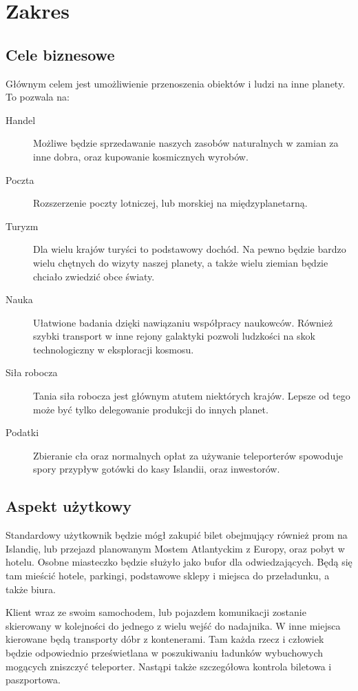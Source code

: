 \section{Zakres} 
\subsection{Cele biznesowe}
Głównym celem jest umożliwienie przenoszenia obiektów i ludzi na inne planety.
To pozwala na:
\begin{description}
\item[Handel] Możliwe będzie sprzedawanie naszych zasobów naturalnych w zamian za inne dobra, oraz kupowanie kosmicznych wyrobów.
\item[Poczta] Rozszerzenie poczty lotniczej, lub morskiej na międzyplanetarną.
\item[Turyzm] Dla wielu krajów turyści to podstawowy dochód. Na pewno będzie bardzo wielu chętnych do wizyty naszej planety, a także wielu ziemian będzie chciało zwiedzić obce światy.
\item[Nauka] Ułatwione badania dzięki nawiązaniu współpracy naukowców. Również szybki transport w inne rejony galaktyki pozwoli ludzkości na skok technologiczny w eksploracji kosmosu.
\item[Siła robocza] Tania siła robocza jest głównym atutem niektórych krajów. Lepsze od tego może być tylko delegowanie produkcji do innych planet.
\item[Podatki] Zbieranie cła oraz normalnych opłat za używanie teleporterów spowoduje spory przypływ gotówki do kasy Islandii, oraz inwestorów.
\end{description}

\subsection{Aspekt użytkowy}
Standardowy użytkownik będzie mógł zakupić bilet obejmujący również prom na Islandię, lub przejazd planowanym Mostem Atlantyckim z Europy, oraz pobyt w hotelu.
Osobne miasteczko będzie służyło jako bufor dla odwiedzających.
Będą się tam mieścić hotele, parkingi, podstawowe sklepy i miejsca do przeładunku, a także biura.

Klient wraz ze swoim samochodem, lub pojazdem komunikacji zostanie skierowany w kolejności do jednego z wielu wejść do nadajnika.
W inne miejsca kierowane będą transporty dóbr z kontenerami.
Tam każda rzecz i człowiek będzie odpowiednio prześwietlana w poszukiwaniu ładunków wybuchowych mogących zniszczyć teleporter.
Nastąpi także szczegółowa kontrola biletowa i paszportowa.


